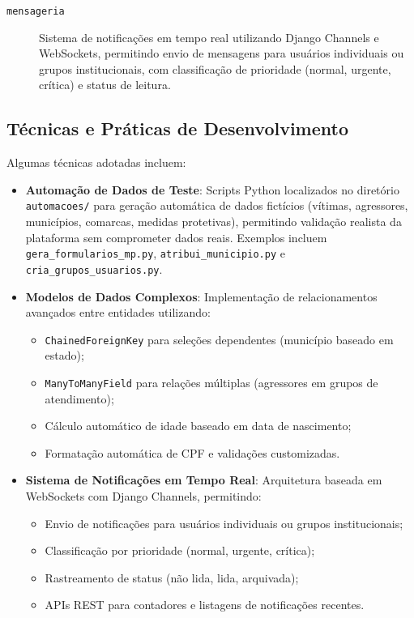 \begin{description}
   \item[\texttt{mensageria}] Sistema de notificações em tempo real utilizando Django Channels e WebSockets, permitindo envio de mensagens para usuários individuais ou grupos institucionais, com classificação de prioridade (normal, urgente, crítica) e status de leitura.
\end{description}

\subsection{Técnicas e Práticas de Desenvolvimento}

Algumas técnicas adotadas incluem:
\begin{itemize}
\item \textbf{Automação de Dados de Teste}: Scripts Python localizados no diretório \texttt{automacoes/} para geração automática de dados fictícios (vítimas, agressores, municípios, comarcas, medidas protetivas), permitindo validação realista da plataforma sem comprometer dados reais. Exemplos incluem \texttt{gera\_formularios\_mp.py}, \texttt{atribui\_municipio.py} e \texttt{cria\_grupos\_usuarios.py}.

\item \textbf{Modelos de Dados Complexos}: Implementação de relacionamentos avançados entre entidades utilizando:
   \begin{itemize}
      \item \texttt{ChainedForeignKey} para seleções dependentes (município baseado em estado);
      \item \texttt{ManyToManyField} para relações múltiplas (agressores em grupos de atendimento);
      \item Cálculo automático de idade baseado em data de nascimento;
      \item Formatação automática de CPF e validações customizadas.
   \end{itemize}

\item \textbf{Sistema de Notificações em Tempo Real}: Arquitetura baseada em WebSockets com Django Channels, permitindo:
   \begin{itemize}
      \item Envio de notificações para usuários individuais ou grupos institucionais;
      \item Classificação por prioridade (normal, urgente, crítica);
      \item Rastreamento de status (não lida, lida, arquivada);
      \item APIs REST para contadores e listagens de notificações recentes.
   \end{itemize}


\end{itemize}
